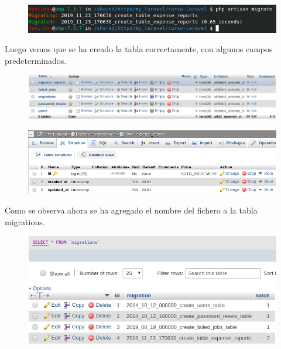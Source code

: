 \documentclass{article}
\begin{document}
\begin{figure}[h!]
  \centering
  \includegraphics[scale=0.75]{./Pictures/028_migrate.png}
\end{figure}

Luego vemos que se ha creado la tabla correctamente, con algunos campos
predeterminados.\\

\begin{figure}[h!]
  \centering
  \includegraphics[scale=0.6]{./Pictures/029_table_created.png}
\end{figure}

\begin{figure}[h!]
  \centering
  \includegraphics[scale=0.7]{./Pictures/030_expense_reports.png}
\end{figure}

Como se observa ahora se ha agregado el nombre del fichero a la tabla
migrations.

\begin{figure}[h!]
  \centering
  \includegraphics[scale=0.6]{./Pictures/031_migrations_table.png}
\end{figure}
\end{document}
